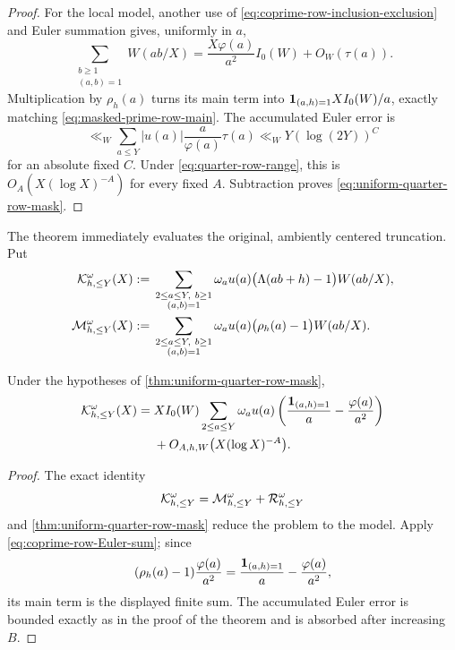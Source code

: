 \begin{proof}
For the local model, another use of
\eqref{eq:coprime-row-inclusion-exclusion} and Euler summation gives,
uniformly in $a$,
\begin{equation}
 \sum_{\substack{b\geq1\\(a,b)=1}}W(ab/X)
 =\frac{X\varphi(a)}{a^2}I_0(W)+O_W(\tau(a)).
 \label{eq:coprime-row-Euler-sum}
\end{equation}
Multiplication by $\rho_h(a)$ turns its main term into
$\mathbf 1_{(a,h)=1}XI_0(W)/a$, exactly matching
\eqref{eq:masked-prime-row-main}.  The accumulated Euler error is
\[
 \ll_W
 \sum_{a\leq Y}|u(a)|\frac{a}{\varphi(a)}\tau(a)
 \ll_WY(\log(2Y))^C
\]
for an absolute fixed $C$.  Under
\eqref{eq:quarter-row-range}, this is
$O_A(X(\log X)^{-A})$ for every fixed $A$.  Subtraction proves
\eqref{eq:uniform-quarter-row-mask}.
\end{proof}

The theorem immediately evaluates the original, ambiently centered
truncation.  Put
\begin{align}
 \mathcal K_{h,\leq Y}^{\omega}(X)
 &:={}
 \sum_{\substack{2\leq a\leq Y,\ b\geq1\\(a,b)=1}}
 \omega_au(a)\bigl(\Lambda(ab+h)-1\bigr)W(ab/X),
 \label{eq:masked-original-truncation}\\
 \mathcal M_{h,\leq Y}^{\omega}(X)
 &:={}
 \sum_{\substack{2\leq a\leq Y,\ b\geq1\\(a,b)=1}}
 \omega_au(a)\bigl(\rho_h(a)-1\bigr)W(ab/X).
 \label{eq:masked-model-truncation}
\end{align}

\begin{corollary}
\label{cor:original-truncated-row-mask}
Under the hypotheses of \cref{thm:uniform-quarter-row-mask},
\begin{align}
 \mathcal K_{h,\leq Y}^{\omega}(X)
 ={}&XI_0(W)
 \sum_{2\leq a\leq Y}\omega_au(a)
 \left(
  \frac{\mathbf 1_{(a,h)=1}}a-\frac{\varphi(a)}{a^2}
 \right)
 \notag\\
 &+O_{A,h,W}\bigl(X(\log X)^{-A}\bigr).
 \label{eq:original-truncated-row-mask-main}
\end{align}
\end{corollary}

\begin{proof}
The exact identity
\[
 \mathcal K_{h,\leq Y}^{\omega}
 =\mathcal M_{h,\leq Y}^{\omega}
 +\mathcal R_{h,\leq Y}^{\omega}
\]
and \cref{thm:uniform-quarter-row-mask} reduce the problem to the model.
Apply \eqref{eq:coprime-row-Euler-sum}; since
\[
 (\rho_h(a)-1)\frac{\varphi(a)}{a^2}
 =\frac{\mathbf 1_{(a,h)=1}}a-\frac{\varphi(a)}{a^2},
\]
its main term is the displayed finite sum.  The accumulated Euler error
is bounded exactly as in the proof of the theorem and is absorbed after
increasing $B$.
\end{proof}

